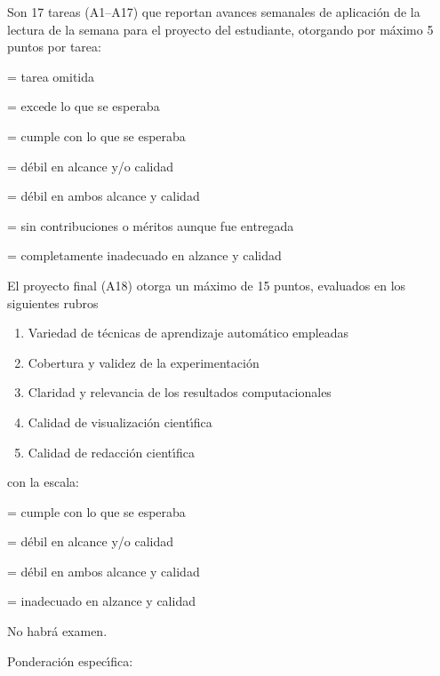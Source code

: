\documentclass[10 pt]{article}
\begin{document}
  Son 17 tareas (A1--A17) que reportan avances semanales de aplicaci\'{o}n
  de la lectura de la semana para el proyecto del estudiante,
  otorgando por m\'{a}ximo 5 puntos por tarea:
  \begin{description}[itemsep=0em]
  \item[NP]{= tarea omitida}
  \item[5]{= excede lo que se esperaba}
  \item[4]{= cumple con lo que se esperaba}
  \item[3]{= d\'{e}bil en alcance y/o calidad}
  \item[2]{= d\'{e}bil en ambos alcance y calidad}
  \item[1]{= sin contribuciones o m\'{e}ritos aunque fue entregada}
  \item[0]{= completamente inadecuado en alzance y calidad}
  \end{description}
  El proyecto final (A18) otorga un m\'{a}ximo de 15 puntos, evaluados en los
  siguientes rubros
  \begin{enumerate}[itemsep=0em]
  \item{Variedad de t\'{e}cnicas de aprendizaje autom\'{a}tico empleadas}
  \item{Cobertura y validez de la experimentaci\'{o}n}
  \item{Claridad y relevancia de los resultados computacionales}    
  \item{Calidad de visualizaci\'{o}n cient\'{\i}fica}
  \item{Calidad de redacci\'{o}n cient\'{\i}fica}
  \end{enumerate}
  con la escala:
  \begin{description}[itemsep=0em]
  \item[3]{= cumple con lo que se esperaba}
  \item[2]{= d\'{e}bil en alcance y/o calidad}
  \item[1]{= d\'{e}bil en ambos alcance y calidad}
  \item[0]{= inadecuado en alzance y calidad}
  \end{description}


  No habr\'{a} examen.


  
  Ponderaci\'{o}n espec\'{\i}fica:
\end{document}
